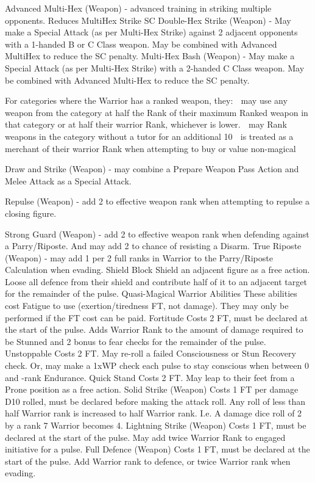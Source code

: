 \documentclass[a4paper]{article}
\begin{document}
\begin{multicols}{3}
Advanced Multi-Hex (Weapon) - advanced training in striking multiple opponents. Reduces MultiHex Strike SC%
Double-Hex Strike (Weapon) - May make a Special Attack (as per Multi-Hex Strike) against 2
adjacent opponents with a 1-handed B or C Class
weapon. May be combined with Advanced MultiHex to reduce the SC penalty.
Multi-Hex Bash (Weapon) - May make a Special
Attack (as per Multi-Hex Strike) with a 2-handed C
Class weapon. May be combined with Advanced
Multi-Hex to reduce the SC penalty.

For categories where the Warrior has a ranked
weapon, they:

may use any weapon from the category at
half the Rank of their maximum Ranked
weapon in that category or at half their warrior Rank, whichever is lower.

may Rank weapons in the category without a
tutor for an additional 10%

is treated as a merchant of their warrior Rank
when attempting to buy or value non-magical

Draw and Strike (Weapon) - may combine a
Prepare Weapon Pass Action and Melee Attack as
a Special Attack.

Repulse (Weapon) - add 2 to effective weapon
rank when attempting to repulse a closing figure.

Strong Guard (Weapon) - add 2 to effective
weapon rank when defending against a
Parry/Riposte. And may add 2%
to chance of resisting a Disarm.
True Riposte (Weapon) - may add 1 per 2 full
ranks in Warrior to the Parry/Riposte Calculation
when evading.
Shield Block Shield an adjacent figure as a free
action. Loose all defence from their shield and
contribute half of it to an adjacent target for the
remainder of the pulse.
Quasi-Magical Warrior Abilities
These abilities cost Fatigue to use (exertion/tiredness FT, not damage). They may only be
performed if the FT cost can be paid.
Fortitude Costs 2 FT, must be declared at the start
of the pulse. Adds Warrior Rank to the amount of
damage required to be Stunned and 2%
bonus to fear checks for the remainder of the pulse.
Unstoppable Costs 2 FT. May re-roll a failed
Consciousness or Stun Recovery check. Or, may
make a 1xWP check each pulse to stay conscious
when between 0 and -rank Endurance.
Quick Stand Costs 2 FT. May leap to their feet
from a Prone position as a free action.
Solid Strike (Weapon) Costs 1 FT per damage
D10 rolled, must be declared before making the
attack roll. Any roll of less than half Warrior rank
is increased to half Warrior rank. I.e. A damage
dice roll of 2 by a rank 7 Warrior becomes 4.
Lightning Strike (Weapon) Costs 1 FT, must be
declared at the start of the pulse. May add twice
Warrior Rank to engaged initiative for a pulse.
Full Defence (Weapon) Costs 1 FT, must be declared at the start of the pulse. Add Warrior rank to
defence, or twice Warrior rank when evading.


\end{multicols}
\end{document}
